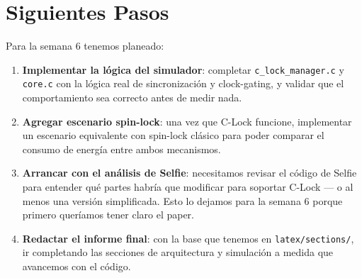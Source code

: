 
\section{Siguientes Pasos}

Para la semana 6 tenemos planeado:

\begin{enumerate}
    \item \textbf{Implementar la lógica del simulador}: completar
          \texttt{c\_lock\_manager.c} y \texttt{core.c} con la lógica real de
          sincronización y clock-gating, y validar que el comportamiento sea
          correcto antes de medir nada.

    \item \textbf{Agregar escenario spin-lock}: una vez que C-Lock funcione,
          implementar un escenario equivalente con spin-lock clásico para poder
          comparar el consumo de energía entre ambos mecanismos.

    \item \textbf{Arrancar con el análisis de Selfie}: necesitamos revisar el
          código de Selfie para entender qué partes habría que modificar para
          soportar C-Lock — o al menos una versión simplificada. Esto lo
          dejamos para la semana 6 porque primero queríamos tener claro el
          paper.

    \item \textbf{Redactar el informe final}: con la base que tenemos en
          \texttt{latex/sections/}, ir completando las secciones de arquitectura
          y simulación a medida que avancemos con el código.
\end{enumerate}
